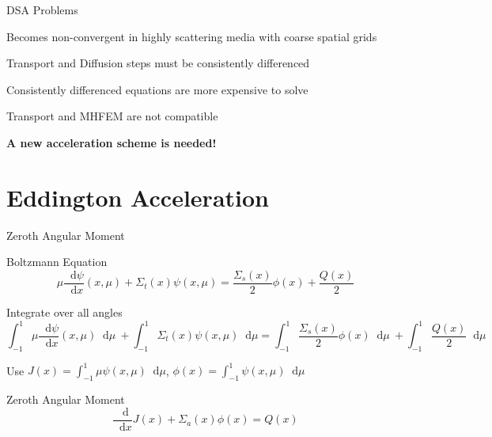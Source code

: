 \documentclass[10pt]{beamer}
\newcommand{\ud}{\mathop{}\!\mathrm{d}} %
\newcommand{\dderiv}[2]{\frac{\ud #1}{\ud #2}}
\begin{document}
\begin{frame}{DSA Problems}

    Becomes non-convergent in highly scattering media with coarse spatial grids 

    Transport and Diffusion steps must be consistently differenced 

    Consistently differenced equations are more expensive to solve 

    Transport and MHFEM are not compatible

    \vfill 
    \centerline{\textbf{A new acceleration scheme is needed!}}

\end{frame}

\section{Eddington Acceleration}

\begin{frame}{Zeroth Angular Moment}

	Boltzmann Equation
	\begin{equation*}
	        \mu \dderiv{\psi}{x}(x, \mu) + 
	        \Sigma_t(x) \psi(x,\mu) = 
	        \frac{\Sigma_s(x)}{2} \phi(x) + 
	        \frac{Q(x)}{2} 
	\end{equation*}

	Integrate over all angles 
	\begin{equation*}
	    \int_{-1}^{1} \mu \dderiv{\psi}{x}(x, \mu) \ud \mu \ + 
	    \int_{-1}^{1} \Sigma_t(x) \psi(x,\mu) \ud \mu = 
	    \int_{-1}^{1} \frac{\Sigma_s(x)}{2} \phi(x) \ud \mu \ + 
	    \int_{-1}^{1} \frac{Q(x)}{2} \ud \mu 
	\end{equation*}

	Use $J(x) = \int_{-1}^{1} \mu \psi(x,\mu) \ud \mu$, 
		$\phi(x) = \int_{-1}^{1} \psi(x,\mu) \ud \mu$ 
	\begin{block}{Zeroth Angular Moment}
	\begin{equation*}
		\dderiv{}{x} J(x) + \Sigma_a(x) \phi(x) = Q(x)
	\end{equation*}
	\end{block}

\end{frame}
\end{document}

